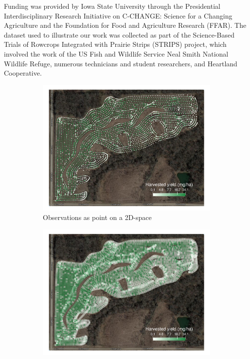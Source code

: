 \documentclass[12pt]{article}
\begin{document}
Funding was provided by Iowa State University through the Presidential
Interdisciplinary Research Initiative on C-CHANGE: Science for a
Changing Agriculture and the Foundation for Food and Agriculture
Research (FFAR). The dataset used to illustrate our work was collected
as part of the Science-Based Trials of Rowcrops Integrated with
Prairie Strips (STRIPS) project, which involved the work of the US Fish
and Wildlife Service Neal Smith National Wildlife Refuge, numerous
technicians and student researchers, and Heartland Cooperative.

\appendix

\begin{figure}
  \begin{subfigure}[b]{0.49\textwidth}
    \centering
    \includegraphics[width=1\textwidth]{appendix/basswood_2012_res5_1_points_vehicle}
    \caption{Observations as point on a 2D-space}
   \end{subfigure}
  \begin{subfigure}[b]{0.49\textwidth}
    \centering
    \includegraphics[width=1\textwidth]{appendix/basswood_2012_res5_1_polygons_vehicle}

\end{subfigure}
\end{figure}
\end{document}
